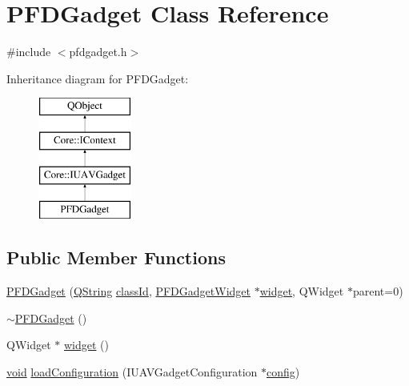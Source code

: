 \hypertarget{class_p_f_d_gadget}{\section{P\-F\-D\-Gadget Class Reference}
\label{class_p_f_d_gadget}
}


{\ttfamily \#include $<$pfdgadget.\-h$>$}

Inheritance diagram for P\-F\-D\-Gadget\-:\begin{figure}[H]
\begin{center}
\leavevmode
\includegraphics[height=4.000000cm]{class_p_f_d_gadget}
\end{center}
\end{figure}
\subsection*{Public Member Functions}
\begin{DoxyCompactItemize}
\item 
\hyperlink{group___o_p_map_plugin_ga64f9ebd08e8c35c1b7b034f1e2ffe9bc}{P\-F\-D\-Gadget} (\hyperlink{group___u_a_v_objects_plugin_gab9d252f49c333c94a72f97ce3105a32d}{Q\-String} \hyperlink{group___core_plugin_ga3878fde66a57220608960bcc3fbeef2c}{class\-Id}, \hyperlink{class_p_f_d_gadget_widget}{P\-F\-D\-Gadget\-Widget} $\ast$\hyperlink{group___o_p_map_plugin_ga61807d4db8adc6952197c390f73bfcda}{widget}, Q\-Widget $\ast$parent=0)
\item 
\hyperlink{group___o_p_map_plugin_ga8c86763f729f03d070b2fed80bbc36ea}{$\sim$\-P\-F\-D\-Gadget} ()
\item 
Q\-Widget $\ast$ \hyperlink{group___o_p_map_plugin_ga61807d4db8adc6952197c390f73bfcda}{widget} ()
\item 
\hyperlink{group___u_a_v_objects_plugin_ga444cf2ff3f0ecbe028adce838d373f5c}{void} \hyperlink{group___o_p_map_plugin_ga2789c1f4ec7af3eff76f4e84551d4fe5}{load\-Configuration} (I\-U\-A\-V\-Gadget\-Configuration $\ast$\hyperlink{deflate_8c_a4473b5227787415097004fd39f55185e}{config})
\end{DoxyCompactItemize}
